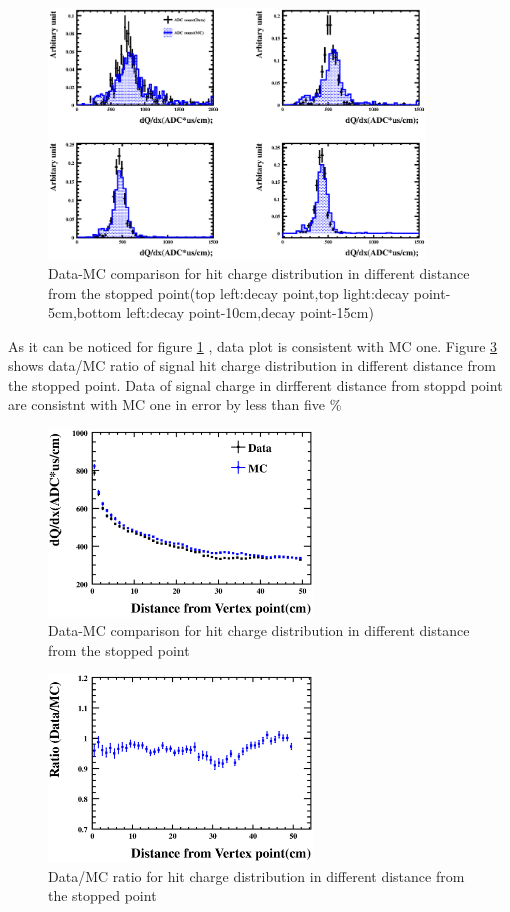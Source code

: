 \begin{figure}[!htb]
  \begin{center}
    \includegraphics[width=100mm]{fig/RangeVsHit4_wcut_hough.eps}
  \end{center}
  \caption{Data-MC comparison for hit charge distribution in different distance from the stopped point(top left:decay point,top light:decay point-5cm,bottom left:decay point-10cm,decay point-15cm)}
  \label{RangeVsHit_hough}
\end{figure}

As it can be noticed for figure \ref{RangeVsHit_hough} , data plot is consistent with MC one.
Figure \ref{RangeVsHitRatio_hough} shows data/MC ratio of signal hit charge distribution in different distance from the stopped point.
Data of signal charge in dirfferent distance from stoppd point are consistnt with MC one in error by less than five $\%$ 

\begin{figure}[htb]
  \begin{center}
    \includegraphics[width=70mm]{fig/RangeVsHitfabs_wcut_hough_ver2.eps}
  \end{center}
  \caption{Data-MC comparison for hit charge distribution in different distance from the stopped point}
  \label{RangeVsHitfabs_hough}
\end{figure}

\begin{figure}[htb]
  \begin{center}
    \includegraphics[width=70mm]{fig/RangeVsHitRatio_wcut_hough_ver2.eps}
  \end{center}
  \caption{Data/MC ratio for hit charge distribution in different distance from the stopped point}
  \label{RangeVsHitRatio_hough}
\end{figure}



